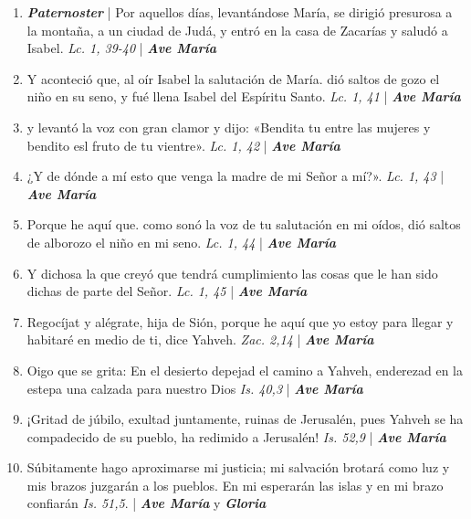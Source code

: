 \documentclass[../../devocionario.tex]{subfiles}
\begin{document}
    \begin{enumerate}
        
        \item \textbf{\textit{Paternoster}} | Por aquellos días, levantándose María, se dirigió presurosa a la montaña, a un ciudad de Judá, 
            y entró en la casa de Zacarías y saludó a Isabel. \textit{Lc. 1, 39-40} | \textbf{\textit{Ave María}}

        \item Y aconteció que, al oír Isabel la salutación de María. dió saltos de gozo el niño en su seno, 
            y fué llena Isabel del Espíritu Santo. \textit{Lc. 1, 41} | \textbf{\textit{Ave María}}

        \item y levantó la voz con gran clamor y dijo: «Bendita tu entre las mujeres y bendito esl fruto de tu vientre». \textit{Lc. 1, 42} | \textbf{\textit{Ave María}}

        \item ¿Y de dónde a mí esto que venga la madre de mi Señor a mí?». \textit{Lc. 1, 43} | \textbf{\textit{Ave María}}

        \item Porque he aquí que. como sonó la voz de tu salutación en mi oídos, dió saltos de alborozo el niño en mi seno. \textit{Lc. 1, 44} | \textbf{\textit{Ave María}}

        \item Y dichosa la que creyó que tendrá cumplimiento las cosas que le han sido dichas de parte del Señor. \textit{Lc. 1, 45} | \textbf{\textit{Ave María}}

        \item Regocíjat y alégrate, hija de Sión, porque he aquí que yo estoy para llegar y habitaré en medio de ti, dice Yahveh. \textit{Zac. 2,14} | \textbf{\textit{Ave María}}

        \item Oigo que se grita: En el desierto depejad el camino a Yahveh, enderezad en la estepa una calzada para nuestro Dios \textit{Is. 40,3} | \textbf{\textit{Ave María}}

        \item ¡Gritad de júbilo, exultad juntamente, ruinas de Jerusalén, pues Yahveh se ha compadecido de su pueblo, 
            ha redimido a Jerusalén! \textit{Is. 52,9} | \textbf{\textit{Ave María}}

        \item Súbitamente hago aproximarse mi justicia; mi salvación brotará como luz y mis brazos juzgarán a los pueblos. 
            En mi esperarán las islas y en mi brazo confiarán \textit{Is. 51,5}. | \textbf{\textit{Ave María}} y \textbf{\textit{Gloria}}

    \end{enumerate}
\end{document}
